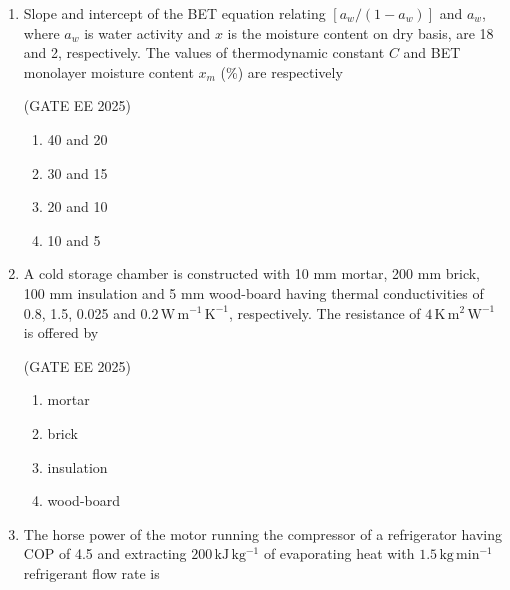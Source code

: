 \documentclass[journal,12pt,onecolumn]{IEEEtran}
\theoremstyle{remark}
\begin{document}
\begin{enumerate}
\hfill(GATE EE 2025)

\begin{multicols}{4}
\begin{enumerate}
    \item $10^{-5}$ 
    \item $10^{-6}$ 
    \item $10^{-8}$ 
    \item $10^{-9}$
\end{enumerate}
\end{multicols}

\item Slope and intercept of the BET equation relating $[a_w/(1-a_w)]$ and $a_w$, where $a_w$ is water activity and $x$ is the moisture content on dry basis, are 18 and 2, respectively. The values of thermodynamic constant $C$ and BET monolayer moisture content $x_m$ (\%) are respectively\

\hfill(GATE EE 2025)

\begin{multicols}{4}
\begin{enumerate}
    \item 40 and 20 
    \item 30 and 15 
    \item 20 and 10 
    \item 10 and 5
\end{enumerate}
\end{multicols}

\item A cold storage chamber is constructed with 10 mm mortar, 200 mm brick, 100 mm insulation and 5 mm wood-board having thermal conductivities of 0.8, 1.5, 0.025 and $0.2\,\mathrm{W\,m^{-1}\,K^{-1}}$, respectively. The resistance of $4\,\mathrm{K\,m^2\,W^{-1}}$ is offered by\

\hfill(GATE EE 2025)

\begin{multicols}{4}
\begin{enumerate}
    \item mortar 
    \item brick 
    \item insulation 
    \item wood-board
\end{enumerate}
\end{multicols}

\item The horse power of the motor running the compressor of a refrigerator having COP of 4.5 and extracting $200\,\mathrm{kJ\,kg^{-1}}$ of evaporating heat with $1.5\,\mathrm{kg\,min^{-1}}$ refrigerant flow rate is\


\end{enumerate}
\end{document}
